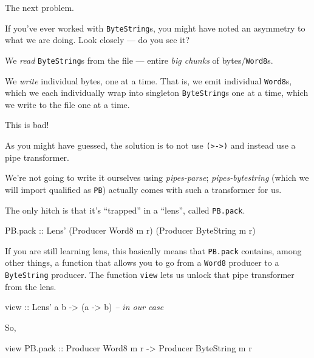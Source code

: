 \documentclass[]{article}
\newenvironment{Shaded}{}{}
\newcommand{\DataTypeTok}[1]{\textcolor[rgb]{0.56,0.13,0.00}{{#1}}}
\newcommand{\CommentTok}[1]{\textcolor[rgb]{0.38,0.63,0.69}{\textit{{#1}}}}
\newcommand{\OtherTok}[1]{\textcolor[rgb]{0.00,0.44,0.13}{{#1}}}
\newcommand{\NormalTok}[1]{{#1}}
\begin{document}
The next problem.

If you've ever worked with \texttt{ByteString}s, you might have noted an
asymmetry to what we are doing. Look closely --- do you see it?

We \emph{read} \texttt{ByteString}s from the file --- entire \emph{big chunks}
of bytes/\texttt{Word8}s.

We \emph{write} individual bytes, one at a time. That is, we emit individual
\texttt{Word8}s, which we each individually wrap into singleton
\texttt{ByteString}s one at a time, which we write to the file one at a time.

This is bad!

As you might have guessed, the solution is to not use
\texttt{(\textgreater{}-\textgreater{})} and instead use a pipe transformer.

We're not going to write it ourselves using \emph{pipes-parse};
\emph{pipes-bytestring} (which we will import qualified as \texttt{PB}) actually
comes with such a transformer for us.

The only hitch is that it's ``trapped'' in a ``lens'', called \texttt{PB.pack}.

\begin{Shaded}
\begin{Highlighting}[]
\NormalTok{PB.pack}\OtherTok{ ::} \DataTypeTok{Lens'} \NormalTok{(}\DataTypeTok{Producer} \DataTypeTok{Word8} \NormalTok{m r) (}\DataTypeTok{Producer} \DataTypeTok{ByteString} \NormalTok{m r)}
\end{Highlighting}
\end{Shaded}

If you are still learning lens, this basically means that \texttt{PB.pack}
contains, among other things, a function that allows you to go from a
\texttt{Word8} producer to a \texttt{ByteString} producer. The function
\texttt{view} lets us unlock that pipe transformer from the lens.

\begin{Shaded}
\begin{Highlighting}[]
\OtherTok{view ::} \DataTypeTok{Lens'} \NormalTok{a b }\OtherTok{->} \NormalTok{(a }\OtherTok{->} \NormalTok{b)       }\CommentTok{-- in our case}
\end{Highlighting}
\end{Shaded}

So,

\begin{Shaded}
\begin{Highlighting}[]
\NormalTok{view PB.pack}\OtherTok{ ::} \DataTypeTok{Producer} \DataTypeTok{Word8}      \NormalTok{m r}
             \OtherTok{->} \DataTypeTok{Producer} \DataTypeTok{ByteString} \NormalTok{m r}
\end{Highlighting}
\end{Shaded}
\end{document}
